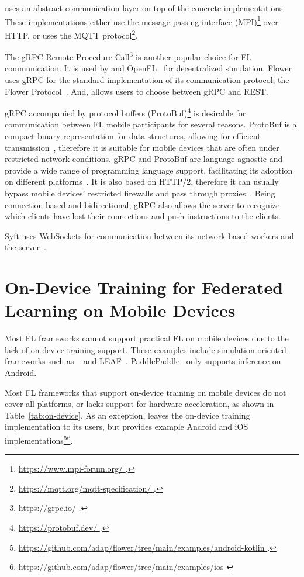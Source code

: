 \documentclass[conference]{IEEEtran}
\begin{document}
\FedML{} uses an abstract communication layer on top of
the concrete implementations.
These implementations either use the message passing interface
(MPI)\footnote{\url{
    https://www.mpi-forum.org/
}.} over HTTP,
or uses the MQTT protocol\footnote{\url{
    https://mqtt.org/mqtt-specification/
}.}.

The gRPC Remote Procedure Call\footnote{\url{
    https://grpc.io/
}.} is another popular choice for FL communication.
It is used by \TFF{} and
OpenFL~\cite{patrick2022openfl} for decentralized simulation.
Flower uses gRPC for the standard implementation of
its communication protocol, the Flower Protocol~\cite{beutel2020flower}.
And, \Florida{} allows users to choose between gRPC and REST.

gRPC accompanied by protocol buffers (ProtoBuf)\footnote{\url{
    https://protobuf.dev/
}.} is desirable for communication between FL mobile participants for
several reasons.
ProtoBuf is a compact binary representation for data structures,
allowing for efficient transmission~\cite{popic2016performance},
therefore it is suitable for mobile devices that
are often under restricted network conditions.
gRPC and ProtoBuf are language-agnostic and
provide a wide range of programming language support,
facilitating its adoption on different platforms~\cite{araujo2020performance}.
It is also based on HTTP/2,
therefore it can usually bypass mobile devices' restricted firewalls and
pass through proxies~\cite{araujo2020performance}.
Being connection-based and bidirectional,
gRPC also allows the server to recognize
which clients have lost their connections and
push instructions to the clients.

Syft uses WebSockets for communication between its network-based workers and
the server~\cite{Ziller2021}.

\section{On-Device Training for Federated Learning on Mobile Devices}

\label{sec:on-device}

Most FL frameworks cannot support practical FL on mobile devices due to
the lack of on-device training support.
These examples include simulation-oriented frameworks such as
\TFF{}~\cite{kholod2020open} and
LEAF~\cite{caldas2018leaf}.
PaddlePaddle~\cite{ma2019paddlepaddle}
only supports inference on Android.

Most FL frameworks that support on-device training on mobile devices do not
cover all platforms,
or lacks support for hardware acceleration,
as shown in Table~\ref{tab:on-device}.
As an exception,
\Flower{} leaves the on-device training implementation to
its users,
but provides example Android and iOS implementations\footnote{\url{
    https://github.com/adap/flower/tree/main/examples/android-kotlin
}.}\footnote{\url{
    https://github.com/adap/flower/tree/main/examples/ios
}}.
\end{document}
